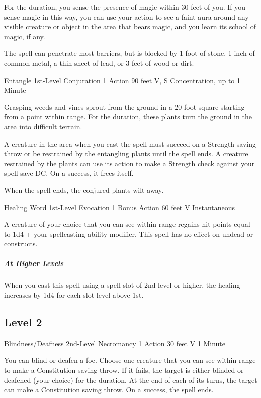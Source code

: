 {For the duration, you sense the presence of magic within 30 feet of you. If you sense magic in this way, you can use your action to see a faint aura around any visible creature or object in the area that bears magic, and you learn its school of magic, if any.

The spell can penetrate most barriers, but is blocked by 1 foot of stone, 1 inch of common metal, a thin sheet of lead, or 3 feet of wood or dirt.

\DndSpellHeader
  {Entangle}
  {1st-Level Conjuration}
  {1 Action}
  {90 feet}
  {V, S}
  {Concentration, up to 1 Minute}

Grasping weeds and vines sprout from the ground in a 20-foot square starting from a point within range. For the duration, these plants turn the ground in the area into difficult terrain.

A creature in the area when you cast the spell must succeed on a Strength saving throw or be restrained by the entangling plants until the spell ends. A creature restrained by the plants can use its action to make a Strength check against your spell save DC. On a success, it frees itself.

When the spell ends, the conjured plants wilt away.

\DndSpellHeader
  {Healing Word}
  {1st-Level Evocation}
  {1 Bonus Action}
  {60 feet}
  {V}
  {Instantaneous}

A creature of your choice that you can see within range regains hit points equal to 1d4 + your spellcasting ability modifier. This spell has no effect on undead or constructs.

\subparagraph*{At Higher Levels} When you cast this spell using a spell slot of 2nd level or higher, the healing increases by 1d4 for each slot level above 1st.

\subsection*{Level 2}

\DndSpellHeader
  {Blindness/Deafness}
  {2nd-Level Necromancy}
  {1 Action}
  {30 feet}
  {V}
  {1 Minute}

You can blind or deafen a foe. Choose one creature that you can see within range to make a Constitution saving throw. If it fails, the target is either blinded or deafened (your choice) for the duration. At the end of each of its turns, the target can make a Constitution saving throw. On a success, the spell ends.

}
